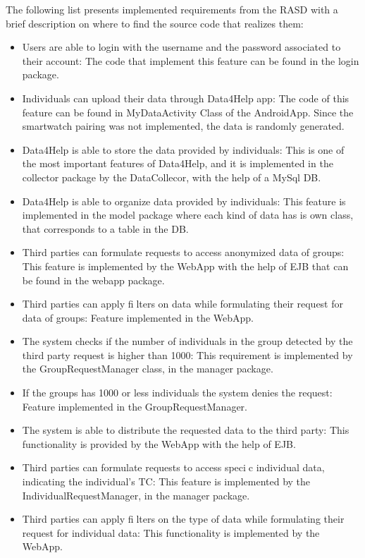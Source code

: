 The following list presents implemented requirements from the RASD with a brief description on where to find the source code that realizes them:

\begin{itemize}
\item Users are able to login with the username and the password associated to
their account: The code that implement this feature can be found in the login package.
\item Individuals can upload their data through Data4Help app: The code of this feature can be found in MyDataActivity Class of the AndroidApp. Since the smartwatch pairing was not implemented, the data is randomly generated.
\item Data4Help is able to store the data provided by individuals: This is one of the most important features of Data4Help, and it is implemented in the collector package by the DataCollecor, with the help of a MySql DB.
\item Data4Help is able to organize data provided by individuals: This feature is implemented in the model package where each kind of data has is own class, that corresponds to a table in the DB.
\item Third parties can formulate requests to access anonymized data of groups: This feature is implemented by the WebApp with the help of EJB that can be found in the webapp package.
\item Third parties can apply filters on data while formulating their request for
data of groups: Feature implemented in the WebApp.
\item The system checks if the number of individuals in the group detected by
the third party request is higher than 1000: This requirement is implemented by the GroupRequestManager class, in the manager package.
\item If the groups has 1000 or less individuals the system denies the request: Feature implemented in the GroupRequestManager.
\item The system is able to distribute the requested data to the third party: This functionality is provided by the WebApp with the help of EJB.
\item Third parties can formulate requests to access specic individual data,
indicating the individual's TC: This feature is implemented by the IndividualRequestManager, in the manager package.
\item Third parties can apply filters on the type of data while formulating their
request for individual data: This functionality is implemented by the WebApp.

\end{itemize}
